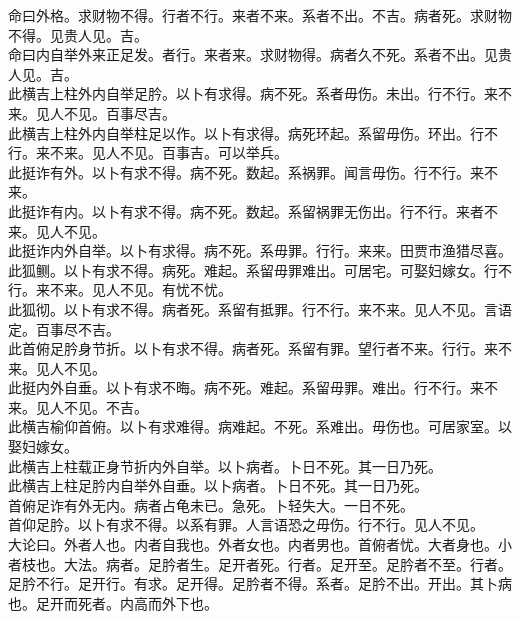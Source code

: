 \documentclass{zhvt-classic}
\begin{document}
\hspace*{2em}命曰外格。求财物不得。行者不行。来者不来。系者不出。不吉。病者死。求财物不得。见贵人见。吉。\\
\hspace*{2em}命曰内自举外来正足发。者行。来者来。求财物得。病者久不死。系者不出。见贵人见。吉。\\
\hspace*{2em}此横吉上柱外内自举足肣。以卜有求得。病不死。系者毋伤。未出。行不行。来不来。见人不见。百事尽吉。\\
\hspace*{2em}此横吉上柱外内自举柱足以作。以卜有求得。病死环起。系留毋伤。环出。行不行。来不来。见人不见。百事吉。可以举兵。\\
\hspace*{2em}此挺诈有外。以卜有求不得。病不死。数起。系祸罪。闻言毋伤。行不行。来不来。\\
\hspace*{2em}此挺诈有内。以卜有求不得。病不死。数起。系留祸罪无伤出。行不行。来者不来。见人不见。\\
\hspace*{2em}此挺诈内外自举。以卜有求得。病不死。系毋罪。行行。来来。田贾市渔猎尽喜。\\
\hspace*{2em}此狐鲗。以卜有求不得。病死。难起。系留毋罪难出。可居宅。可娶妇嫁女。行不行。来不来。见人不见。有忧不忧。\\
\hspace*{2em}此狐彻。以卜有求不得。病者死。系留有抵罪。行不行。来不来。见人不见。言语定。百事尽不吉。\\
\hspace*{2em}此首俯足肣身节折。以卜有求不得。病者死。系留有罪。望行者不来。行行。来不来。见人不见。\\
\hspace*{2em}此挺内外自垂。以卜有求不晦。病不死。难起。系留毋罪。难出。行不行。来不来。见人不见。不吉。\\
\hspace*{2em}此横吉榆仰首俯。以卜有求难得。病难起。不死。系难出。毋伤也。可居家室。以娶妇嫁女。\\
\hspace*{2em}此横吉上柱载正身节折内外自举。以卜病者。卜日不死。其一日乃死。\\
\hspace*{2em}此横吉上柱足肣内自举外自垂。以卜病者。卜日不死。其一日乃死。\\
\hspace*{2em}首俯足诈有外无内。病者占龟未已。急死。卜轻失大。一日不死。\\
\hspace*{2em}首仰足肣。以卜有求不得。以系有罪。人言语恐之毋伤。行不行。见人不见。\\
\hspace*{2em}大论曰。外者人也。内者自我也。外者女也。内者男也。首俯者忧。大者身也。小者枝也。大法。病者。足肣者生。足开者死。行者。足开至。足肣者不至。行者。足肣不行。足开行。有求。足开得。足肣者不得。系者。足肣不出。开出。其卜病也。足开而死者。内高而外下也。\\
\end{document}
